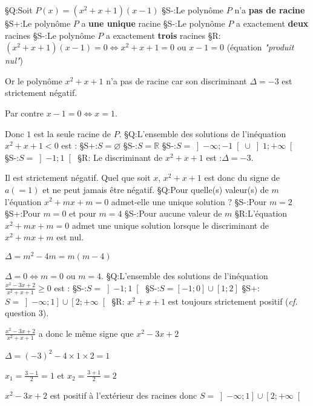 §Q:Soit $P\left(x\right)=\left(x^{2}+x+1\right)\left(x-1\right)$
§S-:Le polynôme $P$ n'a \textbf{pas de racine}
§S+:Le polynôme $P$ a \textbf{une unique} racine
§S-:Le polynôme $P$ a exactement \textbf{deux} racines
§S-:Le polynôme $P$ a exactement \textbf{trois} racines
§R: $\left(x^{2}+x+1\right)\left(x-1\right)=0  \Leftrightarrow   x^{2}+x+1 = 0 $ ou $x-1=0$ (équation \textit{"produit nul"})
\par
Or le polynôme $x^{2}+x+1$ n'a pas de racine car son discriminant $\Delta  = -3$ est strictement négatif.
\par
Par contre $x-1=0 \Leftrightarrow  x=1$.
\par
Donc $1$ est la seule racine de $P$.
§Q:L'ensemble des solutions de l'inéquation $x^{2}+x+1 < 0$ est :
§S+:$S=\varnothing$
§S-:$S=\mathbb{R}$
§S-:$S=\left]-\infty  ; -1\right[ \cup  \left]1 ; +\infty \right[$
§S-:$S=\left]-1 ; 1\right[$
§R:  Le discriminant de $x^{2}+x+1$ est :$\Delta  = -3$.
\par
Il est strictement négatif. Quel que soit $x$, $x^{2}+x+1$ est donc du signe de $a \left(=1\right)$ et ne peut jamais être négatif.
§Q:Pour quelle(s) valeur(s) de $m$ l'équation $x^{2}+mx+m=0$ admet-elle une unique solution ?
§S-:Pour $m=2$
§S+:Pour $m=0$ et pour $m=4$
§S-:Pour aucune valeur de $m$
§R:L'équation $x^{2}+mx+m=0$ admet une unique solution  lorsque le discriminant de $x^{2}+mx+m$ est nul.
\par
$\Delta  = m^{2} - 4m = m\left(m-4\right)$
\par
$\Delta  = 0  \Leftrightarrow  m=0 $ ou $ m=4$.
§Q:L'ensemble des solutions de l'inéquation $\frac{x^{2}-3x+2}{x^{2}+x+1} \geqslant  0$ est :
§S-:$S=\left]-1 ; 1\right[$
§S-:$S=\left[-1 ; 0\right] \cup  \left[1 ; 2\right]$
§S+:$S=\left]-\infty  ; 1\right] \cup  \left[2 ; +\infty \right[$
§R: $x^{2}+x+1$ est toujours strictement positif (\textit{cf.} question 3).
\par
$\frac{x^{2}-3x+2}{x^{2}+x+1}$ a donc le même signe que $x^{2}-3x+2$
\par
$\Delta  = \left(-3\right)^{2}-4\times 1\times 2=1$
\par
$x_{1}=\frac{3-1}{2}=1$ et $x_{2}=\frac{3+1}{2}=2$
\par

$x^{2}-3x+2$ est positif à l'extérieur des racines donc $S=\left]-\infty  ; 1\right] \cup  \left[2 ; +\infty \right[$
